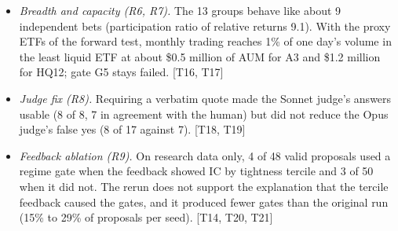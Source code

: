 \begin{itemize}
\item \emph{Breadth and capacity (R6, R7).} The 13 groups behave like about 9 independent bets (participation ratio of relative returns 9.1). With the proxy ETFs of the forward test, monthly trading reaches 1\% of one day's volume in the least liquid ETF at about \$0.5 million of AUM for A3 and \$1.2 million for HQ12; gate G5 stays failed. [T16, T17]
\item \emph{Judge fix (R8).} Requiring a verbatim quote made the Sonnet judge's answers usable (8 of 8, 7 in agreement with the human) but did not reduce the Opus judge's false yes (8 of 17 against 7). [T18, T19]
\item \emph{Feedback ablation (R9).} On research data only, 4 of 48 valid proposals used a regime gate when the feedback showed IC by tightness tercile and 3 of 50 when it did not. The rerun does not support the explanation that the tercile feedback caused the gates, and it produced fewer gates than the original run (15\% to 29\% of proposals per seed). [T14, T20, T21]
\end{itemize}
